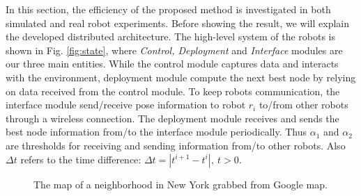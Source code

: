 \documentclass[smallcondensed]{svjour3}
\begin{document}
In this section, the efficiency of the proposed method is investigated in both simulated and real robot experiments. Before showing the result, we will explain the developed distributed architecture. The high-level system of the robots is shown in Fig. \ref{fig:state}, where \textit{Control, Deployment} and \textit{Interface} modules are our three main entities. While the control module captures data and interacts with the environment, deployment module compute the next best node by relying on data received from the control module. To keep robots communication, the interface module send/receive pose information to robot $r_i$ to/from other robots through a wireless connection. The deployment module receives and sends the best node information from/to the interface module periodically. Thus $\alpha_1$ and $\alpha_2$ are thresholds for receiving and sending information from/to other robots. Also  $\Delta t $ refers to the time difference: $\Delta t=|t^{i+1}-t^i|,~ t>0$.

\begin{figure}[H]
	\centering	
	\caption{The map of a neighborhood in New York grabbed from Google map.}
	\label{fig:googlemap}
\end{figure}
\end{document}
